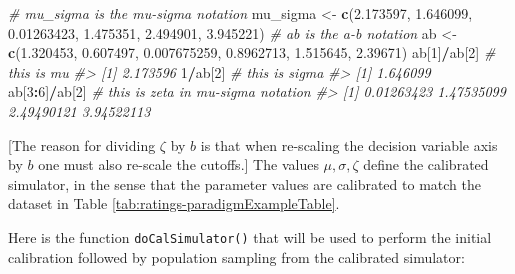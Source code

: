 \documentclass[
]{book}
\newenvironment{Shaded}{\begin{snugshade}}{\end{snugshade}}
\newcommand{\CommentTok}[1]{\textcolor[rgb]{0.56,0.35,0.01}{\textit{#1}}}
\newcommand{\DecValTok}[1]{\textcolor[rgb]{0.00,0.00,0.81}{#1}}
\newcommand{\FloatTok}[1]{\textcolor[rgb]{0.00,0.00,0.81}{#1}}
\newcommand{\KeywordTok}[1]{\textcolor[rgb]{0.13,0.29,0.53}{\textbf{#1}}}
\newcommand{\NormalTok}[1]{#1}
\newcommand{\OperatorTok}[1]{\textcolor[rgb]{0.81,0.36,0.00}{\textbf{#1}}}
\newcommand{\StringTok}[1]{\textcolor[rgb]{0.31,0.60,0.02}{#1}}
\begin{document}
\begin{Shaded}
\begin{Highlighting}[]
\CommentTok{# mu_sigma is the mu-sigma notation}
\NormalTok{mu_sigma <-}\StringTok{ }\KeywordTok{c}\NormalTok{(}\FloatTok{2.173597}\NormalTok{, }\FloatTok{1.646099}\NormalTok{, }\FloatTok{0.01263423}\NormalTok{, }\FloatTok{1.475351}\NormalTok{, }\FloatTok{2.494901}\NormalTok{, }\FloatTok{3.945221}\NormalTok{)}
\CommentTok{# ab is the a-b notation}
\NormalTok{ab <-}\StringTok{ }\KeywordTok{c}\NormalTok{(}\FloatTok{1.320453}\NormalTok{, }\FloatTok{0.607497}\NormalTok{, }\FloatTok{0.007675259}\NormalTok{, }\FloatTok{0.8962713}\NormalTok{, }\FloatTok{1.515645}\NormalTok{, }\FloatTok{2.39671}\NormalTok{)}
\NormalTok{ab[}\DecValTok{1}\NormalTok{]}\OperatorTok{/}\NormalTok{ab[}\DecValTok{2}\NormalTok{] }\CommentTok{# this is mu}
\CommentTok{#> [1] 2.173596}
\DecValTok{1}\OperatorTok{/}\NormalTok{ab[}\DecValTok{2}\NormalTok{]    }\CommentTok{# this is sigma}
\CommentTok{#> [1] 1.646099}
\NormalTok{ab[}\DecValTok{3}\OperatorTok{:}\DecValTok{6}\NormalTok{]}\OperatorTok{/}\NormalTok{ab[}\DecValTok{2}\NormalTok{] }\CommentTok{# this is zeta in mu-sigma notation}
\CommentTok{#> [1] 0.01263423 1.47535099 2.49490121 3.94522113}
\end{Highlighting}
\end{Shaded}

{[}The reason for dividing \(\zeta\) by \(b\) is that when re-scaling the decision variable axis by \(b\) one must also re-scale the cutoffs.{]} The values \(\mu,\sigma,\zeta\) define the calibrated simulator, in the sense that the parameter values are calibrated to match the dataset in Table \ref{tab:ratings-paradigmExampleTable}.

Here is the function \texttt{doCalSimulator()} that will be used to perform the initial calibration followed by population sampling from the calibrated simulator:
\end{document}
